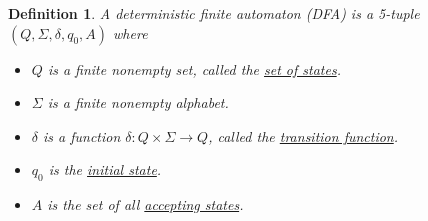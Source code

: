 \documentclass[a4paper]{article}
\newtheorem{defn}{Definition}
\begin{document}
\begin{defn}
    A deterministic finite automaton (DFA) is a 5-tuple $(Q, \Sigma, \delta, q_0, A)$ where
    \begin{itemize}
        \item $Q$ is a finite nonempty set, called the \underline{set of states}.
        \item $\Sigma$ is a finite nonempty alphabet.
        \item $\delta$ is a function $\delta : Q \times \Sigma \to Q$, called the \underline{transition function}.
        \item $q_0$ is the \underline{initial state}.
        \item $A$ is the set of all \underline{accepting states}. 
    \end{itemize}
\end{defn}
\end{document}
